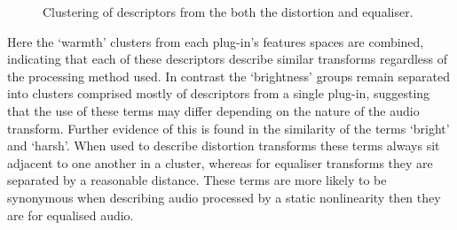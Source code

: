 		\begin{figure}[h!]
			\centering
			\qquad
			\caption{Clustering of descriptors from the both the distortion and equaliser.}
			\label{fig:CombinedClusters}
		\end{figure}

		Here the `warmth' clusters from each plug-in's features spaces are combined, indicating that each of these
		descriptors describe similar transforms regardless of the processing method used. In contrast the
		`brightness' groups remain separated into clusters comprised mostly of descriptors from a single plug-in,
		suggesting that the use of these terms may differ depending on the nature of the audio transform.  Further
		evidence of this is found in the similarity of the terms `bright' and `harsh'. When used to describe
		distortion transforms these terms always sit adjacent to one another in a cluster, whereas for equaliser
		transforms they are separated by a reasonable distance. These terms are more likely to be synonymous when
		describing audio processed by a static nonlinearity then they are for equalised audio.

